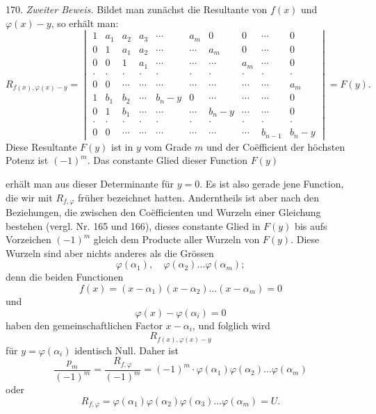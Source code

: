 170. \textit{Zweiter Beweis.} Bildet man zunächst die Resultante von
$f(x)$ und $\varphi(x) - y$, so erhält man:
\[
R_{f(x),\varphi(x)-y} =
\begin{vmatrix}
1 & a_1 & a_2 & a_3 & \cdots & a_m & 0 & 0 & \cdots & 0 \\
0 & 1 & a_1 & a_2 & \cdots & \cdots & a_m & 0 & \cdots & 0 \\
0 & 0 & 1 & a_1 & \cdots & \cdots & \cdots & a_m & \cdots & 0 \\
\cdot & \cdot & \cdot & \cdot & \cdot & \cdot & \cdot & \cdot & \cdot & \cdot \\
0 & 0 & \cdots & \cdots & \cdots & \cdots & \cdots & \cdots & \cdots & a_m \\
1 & b_1 & b_2 & \cdots & b_n - y & 0 & \cdots & \cdots & \cdots & 0 \\
0 & 1 & b_1 & \cdots & \cdots & \cdots & b_n - y & \cdots & \cdots & 0 \\
\cdot & \cdot & \cdot & \cdot & \cdot & \cdot & \cdot & \cdot & \cdot & \cdot \\
0 & 0 & \cdots & \cdots & \cdots & \cdots & \cdots & \cdots & b_{n-1} & b_n - y
\end{vmatrix}
= F(y).
\]
Diese Resultante $F(y)$ ist in $y$ vom Grade $m$ und der Coëfficient der
höchsten Potenz ist $(-1)^m$. Das constante Glied dieser Function $F(y)$


erhält man aus dieser Determinante für $y = 0$. Es ist also gerade jene
Function, die wir mit $R_{f,\varphi}$ früher bezeichnet hatten.
Anderntheils ist aber nach den Beziehungen, die zwischen den
Coëfficienten und Wurzeln einer Gleichung bestehen (vergl. Nr. 165 und
166), dieses constante Glied in $F(y)$ bis aufs Vorzeichen $(-1)^m$
gleich dem Producte aller Wurzeln von $F(y)$. Diese Wurzeln sind aber
nichts anderes als die Grössen
\[
\varphi(\alpha_1), \quad \varphi(\alpha_2) \ldots \varphi(\alpha_m);
\]
denn die beiden Functionen
\[
f(x) = (x - \alpha_1)(x - \alpha_2) \ldots (x - \alpha_m) = 0
\]
und
\[
\varphi(x) - \varphi(\alpha_i) = 0
\]
haben den gemeinschaftlichen Factor $x - \alpha_i$, und folglich wird
\[
R_{f(x),\varphi(x)-y}
\]
für $y = \varphi(\alpha_i)$ identisch Null. Daher ist
\[
\frac{p_m}{(-1)^m} = \frac{R_{f,\varphi}}{(-1)^m} = (-1)^m \cdot \varphi(\alpha_1) \varphi(\alpha_2) \ldots \varphi(\alpha_m)
\]
oder
\[
R_{f,\varphi} = \varphi(\alpha_1) \varphi(\alpha_2) \varphi(\alpha_3) \ldots \varphi(\alpha_m) = U.
\]

